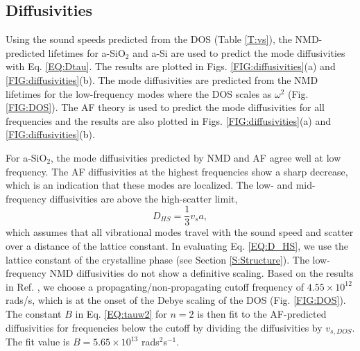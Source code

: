 \documentclass[aps,prb,onecolumn,preprint,superscriptaddress,footinbib,amsmath,amssymb,floatfix]{revtex4}
\begin{document}
\subsection{\label{S:Diffusivities}Diffusivities}

Using the sound speeds predicted 
from the DOS (Table \ref{T:vs}), the NMD-predicted lifetimes 
for a-SiO$_2$ and a-Si are used to predict the mode diffusivities with 
Eq. \eqref{EQ:Dtau}. The results are plotted in 
Figs. \ref{FIG:diffusivities}(a) and \ref{FIG:diffusivities}(b).  
The mode diffusivities are predicted from the NMD lifetimes for the 
low-frequency modes where the DOS scales as $\omega^2$ 
(Fig. \ref{FIG:DOS}). The AF theory is used to predict the mode 
diffusivities for all frequencies and the results are also plotted in 
Figs. \ref{FIG:diffusivities}(a) and \ref{FIG:diffusivities}(b). 

For a-SiO$_2$, the mode diffusivities predicted by NMD and AF agree 
well at low frequency. The AF diffusivities at 
the highest frequencies show a sharp decrease, which is an indication 
that these modes are localized.\cite{feldman_thermal_1993} 
The low- and mid-frequency diffusivities are above the 
high-scatter limit, 
\begin{equation}\label{EQ:D_HS}
D_{HS} = \frac{1}{3} v_s a,
\end{equation}
which assumes that all vibrational modes travel with the sound speed  
and scatter over a distance of the lattice constant.
\cite{cahill_lattice_1988} In evaluating Eq. \eqref{EQ:D_HS}, 
we use the lattice constant of the 
crystalline phase (see Section \ref{S:Structure}). The low-frequency 
NMD diffusivities do not show a 
definitive scaling. Based on the results in 
Ref. , we choose a 
propagating/non-propagating cutoff frequency of 
$4.55\times10^{12}$ rads/s, which is at the onset 
of the Debye scaling of the DOS (Fig. \ref{FIG:DOS}). 
The constant $B$ in Eq. \eqref{EQ:tauw2} for $n=2$ 
is then fit to the AF-predicted diffusivities for 
frequencies below the cutoff by dividing the diffusivities 
by $v_{s,DOS}$. The fit value is $B=5.65\times10^{13}$ 
rads$^2$s$^{-1}$.
\end{document}
